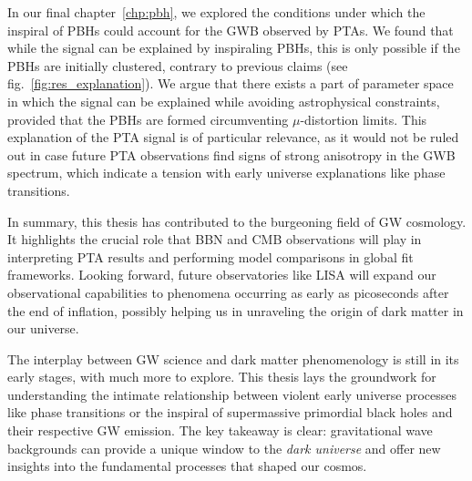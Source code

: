 In our final chapter~\ref{chp:pbh}, we explored the conditions under which the inspiral of \acp{PBH} could account for the \ac{GWB} observed by \acp{PTA}. We found that while the signal can be explained by inspiraling \acp{PBH}, this is only possible if the \acp{PBH} are initially clustered, contrary to previous claims (see fig.~\ref{fig:res_explanation}).  We argue that there exists a part of parameter space in which the signal can be explained while avoiding astrophysical constraints, provided that the \acp{PBH} are formed circumventing $\mu$-distortion limits. This explanation of the \ac{PTA} signal is of particular relevance, as it would not be ruled out in case future \ac{PTA} observations find signs of strong anisotropy in the \ac{GWB} spectrum, which indicate a tension with early universe explanations like phase transitions.

In summary, this thesis has contributed to the burgeoning field of \ac{GW} cosmology. It highlights the crucial role that \ac{BBN} and \ac{CMB} observations will play in interpreting \ac{PTA} results and performing model comparisons in global fit frameworks.  Looking forward, future observatories like \ac{LISA} will expand our observational capabilities to phenomena occurring as early as picoseconds after the end of inflation, possibly helping us in unraveling the origin of dark matter in our universe.

The interplay between \ac{GW} science and dark matter phenomenology is still in its early stages, with much more to explore. This thesis lays the groundwork for understanding the intimate relationship between violent early universe processes like phase transitions or the inspiral of   supermassive primordial black holes and their respective \ac{GW} emission. The key takeaway is clear: gravitational wave backgrounds can provide a unique window to the \textit{dark universe} and offer new insights into the fundamental processes that shaped our cosmos.